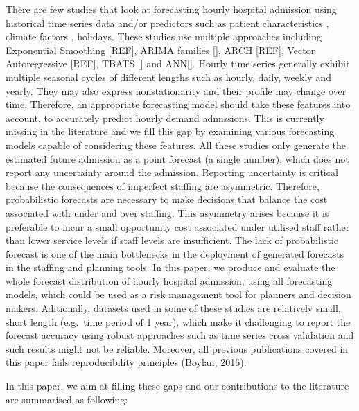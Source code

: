 \documentclass[]{elsarticle} %
\begin{document}
There are few studies that look at forecasting hourly hospital admission using historical time series data and/or predictors such as patient characteristics , climate factors , holidays. These studies use multiple approaches including Exponential Smoothing {[}REF{]}, ARIMA families {[}{]}, ARCH {[}REF{]}, Vector Autoregressive {[}REF{]}, TBATS {[}{]} and ANN{[}{]}. Hourly time series generally exhibit multiple seasonal cycles of different lengths such as hourly, daily, weekly and yearly. They may also express nonstationarity and their profile may change over time. Therefore, an appropriate forecasting model should take these features into account, to accurately predict hourly demand admissions. This is currently missing in the literature and we fill this gap by examining various forecasting models capable of considering these features. All these studies only generate the estimated future admission as a point forecast (a single number), which does not report any uncertainty around the admission. Reporting uncertainty is critical because the consequences of imperfect staffing are asymmetric. Therefore, probabilistic forecasts are necessary to make decisions that balance the cost associated with under and over staffing. This asymmetry arises because it is preferable to incur a small opportunity cost associated under utilised staff rather than lower service levels if staff levels are insufficient. The lack of probabilistic forecast is one of the main bottlenecks in the deployment of generated forecasts in the staffing and planning tools. In this paper, we produce and evaluate the whole forecast distribution of hourly hospital admission, using all forecasting models, which could be used as a risk management tool for planners and decision makers. Aditionally, datasets used in some of these studies are relatively small, short length (e.g.~time period of 1 year), which make it challenging to report the forecast accuracy using robust approaches such as time series cross validation and such results might not be reliable. Moreover, all previous publications covered in this paper fails reproducibility principles (Boylan, 2016).

In this paper, we aim at filling these gaps and our contributions to the literature are summarised as following:
\end{document}
